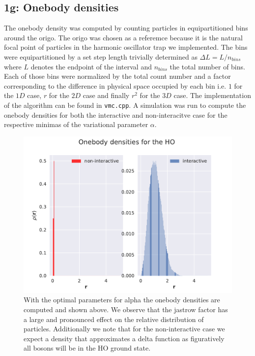 \subsection*{\textbf{1g:} Onebody densities}

The onebody density was computed by counting particles in equipartitioned bins around the origo. The origo was chosen as a referemce because it is the natural focal point of particles in the harmonic oscillator trap we implemented. The bins were equipartitioned by a set step length trivially determined as $\Delta L = L/n_{bins}$ where $L$ denotes the endpoint of the interval and $n_{bins}$ the total number of bins. Each of those bins were normalized by the total count number and a factor corresponding to the difference in physical space occupied by each bin i.e. $1$ for the $1D$ case, $r$ for the $2D$ case and finally $r^2$ for the $3D$ case. The implementation of the algorithm can be found in \lstinline{vmc.cpp}. A simulation was run to compute the onebody densities for both the interactive and non-interacitve case for the respective minimas of the variational parameter $\alpha$. 

\begin{figure}
\includegraphics{figures/obd_i_ni.pdf}
\caption{With the optimal parameters for alpha the onebody densities are computed and shown above. We observe that the jastrow factor has a large and pronounced effect on the relative distribution of particles. Additionally we note that for the non-interactive case we expect a density that approximates a delta function as figuratively all bosons will be in the HO ground state.}\label{fig:obd_i_ni}
\end{figure} 